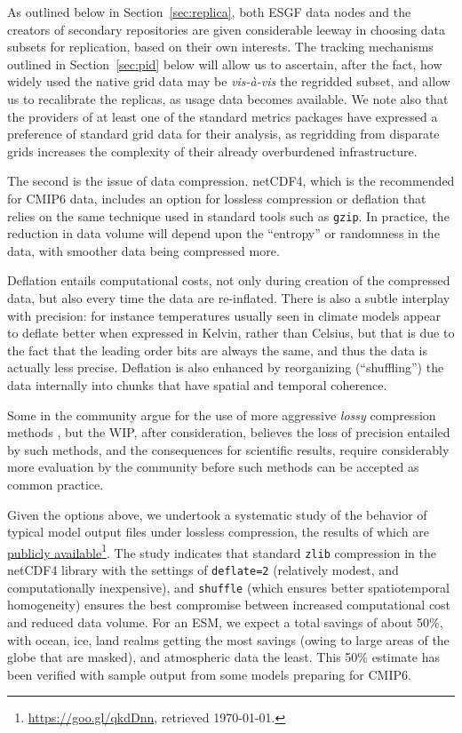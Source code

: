 \documentclass[gmd,manuscript]{copernicus}
\newcommand{\pllabel}[1]{\label{p-#1}\linelabel{l-#1}}
\newcommand{\urlref}[2] {\href{#1}{#2}\footnote{\url{#1}, retrieved \today.}}
\begin{document}
As outlined below in Section~\ref{sec:replica}, both ESGF data nodes
and the creators of secondary repositories are given considerable
leeway in choosing data subsets for replication, based on their own
interests. The tracking mechanisms outlined in Section~\ref{sec:pid}
below will allow us to ascertain, after the fact, how widely used the
native grid data may be \emph{vis-\`a-vis} the regridded subset, and
allow us to recalibrate the replicas, as usage data becomes available.
We note also that the providers of at least one of the standard
metrics packages \citep[ESMValTool,][]{ref:eyringetal2016a} have
expressed a preference of standard grid data for their analysis, as
regridding from disparate grids increases the complexity of their
already overburdened infrastructure.

The second is the issue of data compression. netCDF4, which is the
recommended for CMIP6 data, includes an option for lossless
compression or deflation \citep{ref:zivlempel1977} that relies on the
same technique used in standard tools such as \texttt{gzip}. In
practice, the reduction in data volume will depend upon the
``entropy'' or randomness in the data, with smoother data being
compressed more.

Deflation entails computational costs, not only during creation of the
compressed data, but also every time the data are re-inflated. There
is also a subtle interplay with precision: for instance temperatures
usually seen in climate models appear to deflate better when expressed
in Kelvin, rather than Celsius, but that is due to the fact that the
leading order bits are always the same, and thus the data is actually
less precise. Deflation is also enhanced by reorganizing
(``shuffling'') the data internally into chunks that have spatial and
temporal coherence.

Some in the community argue for the use of more aggressive
\emph{lossy} compression methods \citep{ref:bakeretal2016}, but the
WIP, after consideration, believes the loss of precision entailed by
such methods, and the consequences for scientific results, require
considerably more evaluation by the community before such methods can
be accepted as common practice.

Given the options above, we undertook a systematic study of the
behavior of typical model output files under lossless compression, the
results of which are \urlref{https://goo.gl/qkdDnn}{publicly
  available}. The study indicates that standard \texttt{zlib}
compression in the netCDF4 library with the settings of
\texttt{deflate=2} (relatively modest, and computationally
inexpensive), and \texttt{shuffle} (which ensures better
spatiotemporal homogeneity) ensures the best compromise between
increased computational cost and reduced data volume. For an ESM,
\pllabel{RC1-25}
we expect a total savings of about 50\%, with ocean, ice, land realms
getting the most savings (owing to large areas of the globe that are
masked), and atmospheric data the least. This 50\% estimate has been
verified with sample output from some models preparing for CMIP6.
\end{document}
